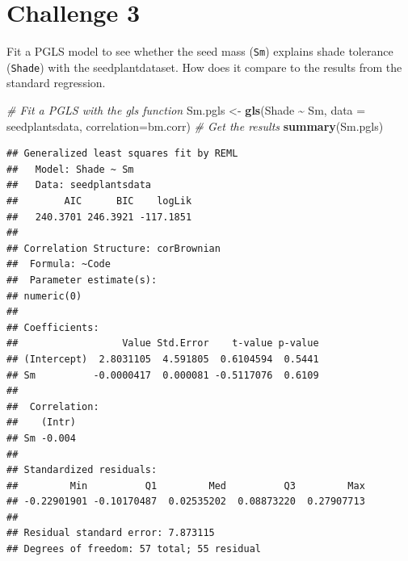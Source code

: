 \documentclass[
]{book}
\newenvironment{Shaded}{\begin{snugshade}}{\end{snugshade}}
\newcommand{\AttributeTok}[1]{\textcolor[rgb]{0.13,0.29,0.53}{#1}}
\newcommand{\CommentTok}[1]{\textcolor[rgb]{0.56,0.35,0.01}{\textit{#1}}}
\newcommand{\FunctionTok}[1]{\textcolor[rgb]{0.13,0.29,0.53}{\textbf{#1}}}
\newcommand{\NormalTok}[1]{#1}
\newcommand{\OtherTok}[1]{\textcolor[rgb]{0.56,0.35,0.01}{#1}}
\newcommand{\SpecialCharTok}[1]{\textcolor[rgb]{0.81,0.36,0.00}{\textbf{#1}}}
\begin{document}
\section{Challenge 3}\label{challenge-3-1}

Fit a PGLS model to see whether the seed mass (\texttt{Sm}) explains shade tolerance (\texttt{Shade}) with the seedplantdataset. How does it compare to the results from the standard regression.

\begin{Shaded}
\begin{Highlighting}[]
\CommentTok{\# Fit a PGLS with the gls function}
\NormalTok{Sm.pgls }\OtherTok{\textless{}{-}} \FunctionTok{gls}\NormalTok{(Shade }\SpecialCharTok{\textasciitilde{}}\NormalTok{ Sm, }\AttributeTok{data =}\NormalTok{ seedplantsdata, }\AttributeTok{correlation=}\NormalTok{bm.corr)}
\CommentTok{\# Get the results}
\FunctionTok{summary}\NormalTok{(Sm.pgls)}
\end{Highlighting}
\end{Shaded}

\begin{verbatim}
## Generalized least squares fit by REML
##   Model: Shade ~ Sm 
##   Data: seedplantsdata 
##        AIC      BIC    logLik
##   240.3701 246.3921 -117.1851
## 
## Correlation Structure: corBrownian
##  Formula: ~Code 
##  Parameter estimate(s):
## numeric(0)
## 
## Coefficients:
##                  Value Std.Error    t-value p-value
## (Intercept)  2.8031105  4.591805  0.6104594  0.5441
## Sm          -0.0000417  0.000081 -0.5117076  0.6109
## 
##  Correlation: 
##    (Intr)
## Sm -0.004
## 
## Standardized residuals:
##         Min          Q1         Med          Q3         Max 
## -0.22901901 -0.10170487  0.02535202  0.08873220  0.27907713 
## 
## Residual standard error: 7.873115 
## Degrees of freedom: 57 total; 55 residual
\end{verbatim}
\end{document}
